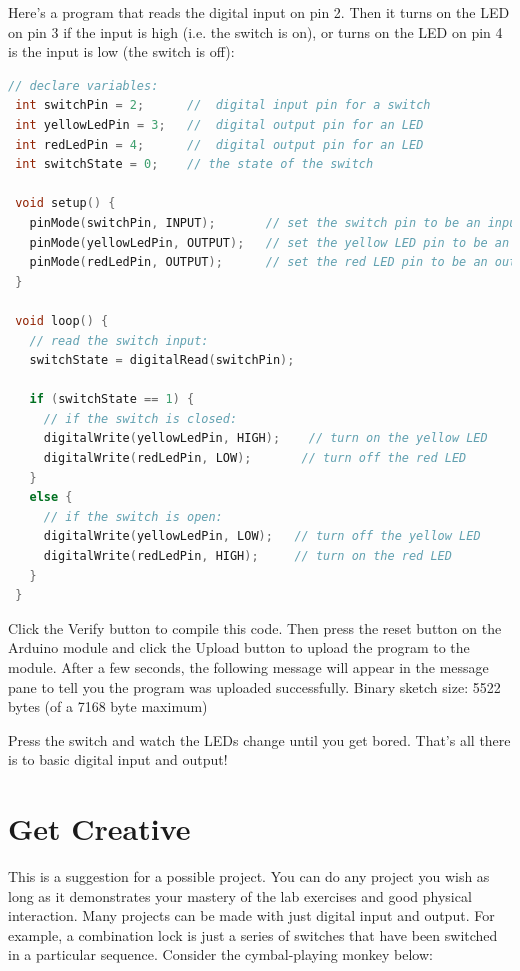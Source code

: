 Here's a program that reads the digital input on pin 2. Then it turns on the LED on pin 3 if the input is high (i.e. the switch is on), or turns on the LED on pin 4 is the input is low (the switch is off):

\begin{lstlisting}[language=C]
 // declare variables:
 int switchPin = 2;      //  digital input pin for a switch
 int yellowLedPin = 3;   //  digital output pin for an LED
 int redLedPin = 4;      //  digital output pin for an LED
 int switchState = 0;    // the state of the switch

 void setup() {
   pinMode(switchPin, INPUT);       // set the switch pin to be an input
   pinMode(yellowLedPin, OUTPUT);   // set the yellow LED pin to be an output
   pinMode(redLedPin, OUTPUT);      // set the red LED pin to be an output
 }

 void loop() {
   // read the switch input:
   switchState = digitalRead(switchPin);

   if (switchState == 1) {
     // if the switch is closed:
     digitalWrite(yellowLedPin, HIGH);    // turn on the yellow LED
     digitalWrite(redLedPin, LOW);       // turn off the red LED
   } 
   else {
     // if the switch is open:
     digitalWrite(yellowLedPin, LOW);   // turn off the yellow LED
     digitalWrite(redLedPin, HIGH);     // turn on the red LED
   }
 }
\end{lstlisting}

Click the Verify button to compile this code. Then press the reset button on the Arduino module and click the Upload button to upload the program to the module. After a few seconds, the following message will appear in the message pane to tell you the program was uploaded successfully.
Binary sketch size: 5522 bytes (of a 7168 byte maximum)

Press the switch and watch the LEDs change until you get bored. That's all there is to basic digital input and output!

\section{Get Creative}

This is a suggestion for a possible project. You can do any project you wish as long as it demonstrates your mastery of the lab exercises and good physical interaction.
Many projects can be made with just digital input and output. For example, a combination lock is just a series of switches that have been switched in a particular sequence. Consider the cymbal-playing monkey below:

